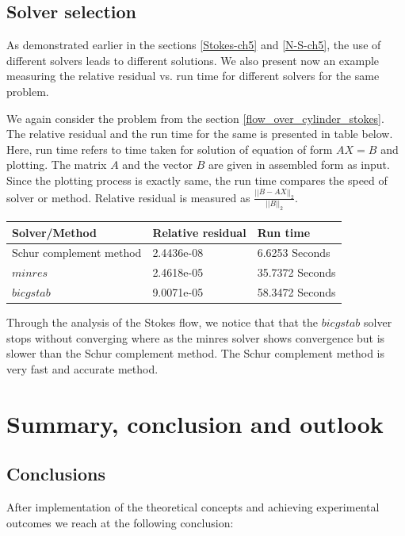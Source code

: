 \documentclass[a4paper,twoside,openright]{book}
\begin{document}
\section{Solver selection}

As demonstrated earlier in the sections \ref{Stokes-ch5} and \ref{N-S-ch5}, the use of different solvers leads to different solutions. We also present now an example measuring the relative residual vs. run time for different solvers for the same problem.

We again consider the problem from the section \ref{flow_over_cylinder_stokes}. The relative residual and the run time for the same is presented in table below.
Here, run time refers to time taken for solution of equation of form $AX = B$ and plotting.  The matrix $A$ and the vector $B$ are given in assembled form as input. Since the plotting process is exactly same, the run time compares the speed of solver or method. Relative residual is measured as $\frac{||B-AX||_2}{||B||_2}$.

\begin{longtable}{| p{} | p{} | p{} |}
\hline
\textbf{Solver/Method} & \textbf{Relative residual} & \textbf{Run time}\\
\hline
Schur complement method & 2.4436e-08 & 6.6253 Seconds\\
\hline
$minres$ & 2.4618e-05 & 35.7372 Seconds\\
\hline
$bicgstab$ & 9.0071e-05 & 58.3472 Seconds\\
\hline
\end{longtable}

Through the analysis of the Stokes flow, we notice that that the $bicgstab$ solver stops without converging where as the minres solver shows convergence but is slower than the Schur complement method. The Schur complement method is very fast and accurate method.

\chapter{Summary, conclusion and outlook}

\section{Conclusions}

After implementation of the theoretical concepts and achieving experimental outcomes we reach at the following conclusion: \\
\end{document}
